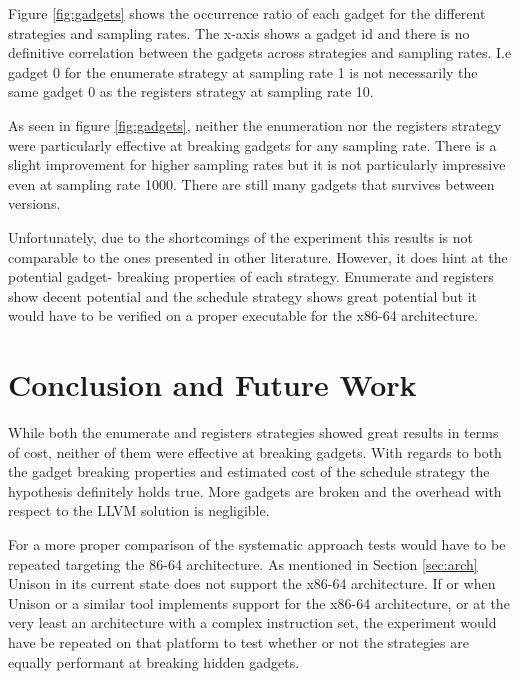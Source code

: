 Figure \ref{fig:gadgets} shows the occurrence ratio of each gadget for the different
strategies and sampling rates. The x-axis shows a gadget id and there is no definitive
correlation between the gadgets across strategies and sampling rates. I.e gadget 0 for the
enumerate strategy at sampling rate 1 is not necessarily the same gadget 0 as the registers
strategy at sampling rate 10.

As seen in figure \ref{fig:gadgets}, neither the enumeration nor the registers strategy
were particularly effective at breaking gadgets for any sampling rate. There is a slight
improvement for higher sampling rates but it is not particularly impressive even at
sampling rate 1000. There are still many gadgets that survives between versions.

Unfortunately, due to the shortcomings of the experiment this results is not comparable to
the ones presented in other literature. However, it does hint at the potential gadget-
breaking properties of each strategy. Enumerate and registers show decent potential and the
schedule strategy shows great potential but it would have to be verified on a proper
executable for the x86-64 architecture.

\section{Conclusion and Future Work}


While both the enumerate and registers strategies showed great results in terms of cost,
neither of them were effective at breaking gadgets. With regards to both the gadget
breaking properties and estimated cost of the schedule strategy the hypothesis definitely
holds true. More gadgets are broken and the overhead with respect to the LLVM solution
is negligible.

For a more proper comparison of the systematic approach tests would have to be repeated
targeting the 86-64 architecture. As mentioned in Section \ref{sec:arch} Unison in its
current state does not support the x86-64 architecture. If or when Unison or a similar
tool implements support for the x86-64 architecture, or at the very least an architecture
with a complex instruction set, the experiment would have be repeated on that platform to
test whether or not the strategies are equally performant at breaking hidden gadgets.

